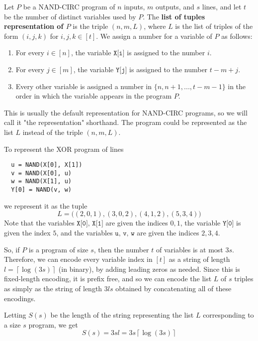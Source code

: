   \begin{definition}
  Let $P$ be a NAND-CIRC program of $n$ inputs, $m$ outputs, and $s$ lines, and let $t$ be the number of distinct variables used by $P$. The \textbf{list of tuples representation of $P$} is the triple $(n, m, L)$, where $L$ is the list of triples of the form $(i, j, k)$ for $i, j, k \in [t]$. We assign a number for a variable of $P$ as follows:
  \begin{enumerate}
      \item For every $i \in [n]$, the variable $\texttt{X[i]}$ is assigned to the number $i$. 
      \item For every $j \in [m]$, the variable $\texttt{Y[j]}$ is assigned to the number $t - m + j$.
      \item Every other variable is assigned a number in $\{n, n+1, ..., t-m-1\}$ in the order in which the variable appears in the program $P$. 
  \end{enumerate}
  This is usually the default representation for NAND-CIRC programs, so we will call it "the representation" shorthand. The program could be represented as the list $L$ instead of the triple $(n, m, L)$. 
  \end{definition}

  \begin{example}
  To represent the XOR program of lines 
  \begin{lstlisting}
  u = NAND(X[0], X[1])
  v = NAND(X[0], u) 
  w = NAND(X[1], u)
  Y[0] = NAND(v, w)
  \end{lstlisting}
  we represent it as the tuple 
  \[L = \big( (2, 0, 1), (3, 0, 2), (4, 1, 2), (5, 3, 4)\big) \]
  Note that the variables $\texttt{X[0], X[1]}$ are given the indices $0, 1$, the variable $\texttt{Y[0]}$ is given the index $5$, and the variables $\texttt{u, v, w}$ are given the indices $2, 3, 4$. 
  \end{example}

  So, if $P$ is a program of size $s$, then the number $t$ of variables is at most $3s$. Therefore, we can encode every variable index in $[t]$ as a string of length $l = \left\lceil{\log(3s)}\right\rceil$ (in binary), by adding leading zeros as needed. Since this is fixed-length encoding, it is prefix free, and so we can encode the list $L$ of $s$ triples as simply as the string of length $3ls$ obtained by concatenating all of these encodings. 

  Letting $S(s)$ be the length of the string representing the list $L$ corresponding to a size $s$ program, we get
  \[S(s) = 3sl = 3s \left\lceil{\log(3s)}\right\rceil\]

